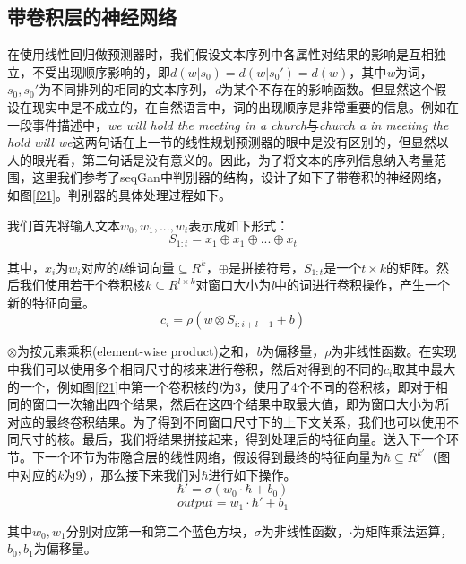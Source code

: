 \documentclass[12pt]{template}
\begin{document}
\subsection{带卷积层的神经网络}
在使用线性回归做预测器时，我们假设文本序列中各属性对结果的影响是互相独立，不受出现顺序影响的，即\(d(w|s_0)=d(w|s_0')=d(w)\)，其中\textit{w}为词，\(s_0,s_0'\)为不同排列的相同的文本序列，\textit{d}为某个不存在的影响函数。但显然这个假设在现实中是不成立的，在自然语言中，词的出现顺序是非常重要的信息。例如在一段事件描述中，\textit{we will hold the meeting in a church}与\textit{church a in meeting the hold will we}这两句话在上一节的线性规划预测器的眼中是没有区别的，但显然以人的眼光看，第二句话是没有意义的。因此，为了将文本的序列信息纳入考量范围，这里我们参考了seqGan\cite{yu_seqgan:_2016}中判别器的结构，设计了如下了带卷积的神经网络，如图\ref{f21}。判别器的具体处理过程如下。

我们首先将输入文本\(w_0,w_1,...,w_t\)表示成如下形式：
\begin{equation}
S_{1:t}=x_1\oplus x_1\oplus...\oplus x_t
\end{equation}

其中，\(x_i\)为\(w_i\)对应的\textit{k}维词向量\(\subseteq R^k\)，\(\oplus\)是拼接符号，\(S_{1:t}\)是一个\(t\times k\)的矩阵。然后我们使用若干个卷积核\(k\subseteq R^{l\times k}\)对窗口大小为\textit{l}中的词进行卷积操作，产生一个新的特征向量。
\begin{equation}
c_i=\rho(w\otimes S_{i:i+l-1}+b)
\end{equation}

\(\otimes\)为按元素乘积(element-wise product)之和，\textit{b}为偏移量，\(\rho\)为非线性函数。在实现中我们可以使用多个相同尺寸的核来进行卷积，然后对得到的不同的\(c_i\)取其中最大的一个，例如图\ref{f21}中第一个卷积核的\textit{l}为3，使用了4个不同的卷积核，即对于相同的窗口一次输出四个结果，然后在这四个结果中取最大值，即为窗口大小为\textit{l}所对应的最终卷积结果。为了得到不同窗口尺寸下的上下文关系，我们也可以使用不同尺寸的核。最后，我们将结果拼接起来，得到处理后的特征向量。送入下一个环节。下一个环节为带隐含层的线性网络，假设得到最终的特征向量为\(\hbar\subseteq R^{k'}\)（图中对应的\textit{k}为9），那么接下来我们对\(\hbar\)进行如下操作。
\begin{equation}
\hbar'=\sigma(w_0\cdot\hbar+b_0)
\end{equation}
\begin{equation}
output = w_1\cdot\hbar'+b_1
\end{equation}

其中\(w_0,w_1\)分别对应第一和第二个蓝色方块，\(\sigma\)为非线性函数，\(\cdot\)为矩阵乘法运算，\(b_0,b_1\)为偏移量。
\end{document}
